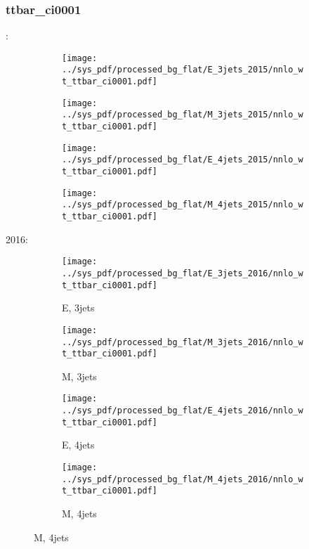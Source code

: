 \documentclass{beamer}
\begin{document}
\begin{frame}
\frametitle{ttbar_ci0001}
\fontsize{5}{1}:
\begin{figure}
\centering
\begin{subfigure}[b]{0.24\textwidth}
\texttt{[image: ../sys\_pdf/processed\_bg\_flat/E\_3jets\_2015/nnlo\_wt\_ttbar\_ci0001.pdf]}
\end{subfigure}
\begin{subfigure}[b]{0.24\textwidth}
\texttt{[image: ../sys\_pdf/processed\_bg\_flat/M\_3jets\_2015/nnlo\_wt\_ttbar\_ci0001.pdf]}
\end{subfigure}
\begin{subfigure}[b]{0.24\textwidth}
\texttt{[image: ../sys\_pdf/processed\_bg\_flat/E\_4jets\_2015/nnlo\_wt\_ttbar\_ci0001.pdf]}
\end{subfigure}
\begin{subfigure}[b]{0.24\textwidth}
\texttt{[image: ../sys\_pdf/processed\_bg\_flat/M\_4jets\_2015/nnlo\_wt\_ttbar\_ci0001.pdf]}
\end{subfigure}
\end{figure}
2016:
\begin{figure}
\centering
\begin{subfigure}[b]{0.24\textwidth}
\texttt{[image: ../sys\_pdf/processed\_bg\_flat/E\_3jets\_2016/nnlo\_wt\_ttbar\_ci0001.pdf]}
\captionsetup{font=tiny}
\caption{E, 3jets}
\end{subfigure}
\begin{subfigure}[b]{0.24\textwidth}
\texttt{[image: ../sys\_pdf/processed\_bg\_flat/M\_3jets\_2016/nnlo\_wt\_ttbar\_ci0001.pdf]}
\captionsetup{font=tiny}
\caption{M, 3jets}
\end{subfigure}
\begin{subfigure}[b]{0.24\textwidth}
\texttt{[image: ../sys\_pdf/processed\_bg\_flat/E\_4jets\_2016/nnlo\_wt\_ttbar\_ci0001.pdf]}
\captionsetup{font=tiny}
\caption{E, 4jets}
\end{subfigure}
\begin{subfigure}[b]{0.24\textwidth}
\texttt{[image: ../sys\_pdf/processed\_bg\_flat/M\_4jets\_2016/nnlo\_wt\_ttbar\_ci0001.pdf]}
\captionsetup{font=tiny}
\caption{M, 4jets}
\end{subfigure}
\end{figure}
\end{frame}
\end{document}
